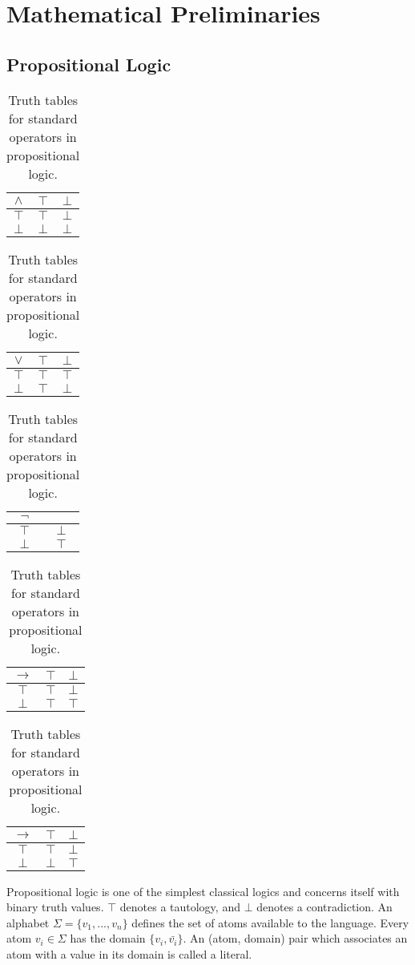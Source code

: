 \chapter{Mathematical Preliminaries}\label{chp:prelim} 
\section{Propositional Logic}

\begin{table}
\begin{center}


\begin{tabular}{ c | c c }
  $\land$& $\top$ & $\bot$ \\ \hline
 $\top$ & $\top$ & $\bot$ \\  
 $\bot$ & $\bot$ &  $\bot$
\end{tabular}
\quad
\begin{tabular}{ c | c c }
  $\lor$& $\top$ & $\bot$ \\ \hline
 $\top$ & $\top$ & $\top$ \\  
 $\bot$ & $\top$ &  $\bot$
\end{tabular}
\quad
\begin{tabular}{ c | c }
  $\lnot$& \\ \hline
 $\top$ & $\bot$ \\  
 $\bot$ & $\top$
\end{tabular}

\begin{tabular}{ c | c c }
  $\rightarrow$& $\top$ & $\bot$ \\ \hline
 $\top$ & $\top$ & $\bot$ \\  
 $\bot$ & $\top$ &  $\top$
\end{tabular}
\quad
\begin{tabular}{ c | c c }
  $\rightarrow$& $\top$ & $\bot$ \\ \hline
 $\top$ & $\top$ & $\bot$ \\  
 $\bot$ & $\bot$ &  $\top$
\end{tabular}

\caption{Truth tables for standard operators in propositional logic.}
\label{tbl:prop}

\end{center}
\end{table}

Propositional logic is one of the simplest classical logics and concerns itself with binary truth values. $\top$ denotes a tautology, and $\bot$ denotes a contradiction. An alphabet $\Sigma=\{v_1,...,v_n\}$ defines the set of atoms available to the language. Every atom $v_i \in \Sigma$ has the domain $\{v_i, \bar{v_i}\}$. An (atom, domain) pair which associates an atom with a value in its domain is called a literal.


